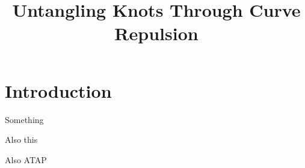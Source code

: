 \documentclass[a4paper, 12pt]{article}
\title{Untangling Knots Through Curve Repulsion}
\author{}
\begin{document}



\tableofcontents
\section{Introduction}


Something \cite{YSC2021}

Also this \cite{BO1995}

Also ATAP \cite{Trefethen_2020}

\printbibliography
\end{document}
